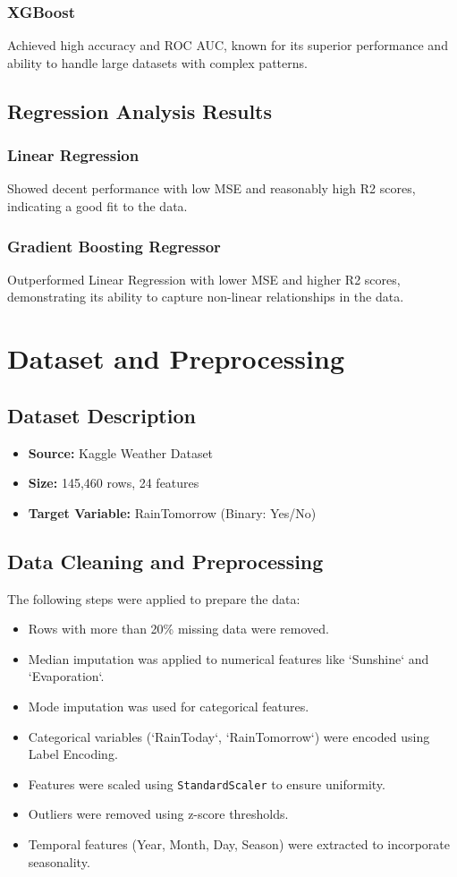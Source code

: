 \documentclass[12pt]{article}
\begin{document}
\subsubsection{XGBoost}
Achieved high accuracy and ROC AUC, known for its superior performance and ability to handle large datasets with complex patterns.

\subsection{Regression Analysis Results}
\subsubsection{Linear Regression}
Showed decent performance with low MSE and reasonably high R2 scores, indicating a good fit to the data.

\subsubsection{Gradient Boosting Regressor}
Outperformed Linear Regression with lower MSE and higher R2 scores, demonstrating its ability to capture non-linear relationships in the data.



\section{Dataset and Preprocessing}
\subsection{Dataset Description}
\begin{itemize}
    \item \textbf{Source:} Kaggle Weather Dataset
    \item \textbf{Size:} 145,460 rows, 24 features
    \item \textbf{Target Variable:} RainTomorrow (Binary: Yes/No)
\end{itemize}

\subsection{Data Cleaning and Preprocessing}
The following steps were applied to prepare the data:
\begin{itemize}
    \item Rows with more than 20\% missing data were removed.
    \item Median imputation was applied to numerical features like `Sunshine` and `Evaporation`.
    \item Mode imputation was used for categorical features.
    \item Categorical variables (`RainToday`, `RainTomorrow`) were encoded using Label Encoding.
    \item Features were scaled using \texttt{StandardScaler} to ensure uniformity.
    \item Outliers were removed using z-score thresholds.
    \item Temporal features (Year, Month, Day, Season) were extracted to incorporate seasonality.
\end{itemize}
\end{document}
